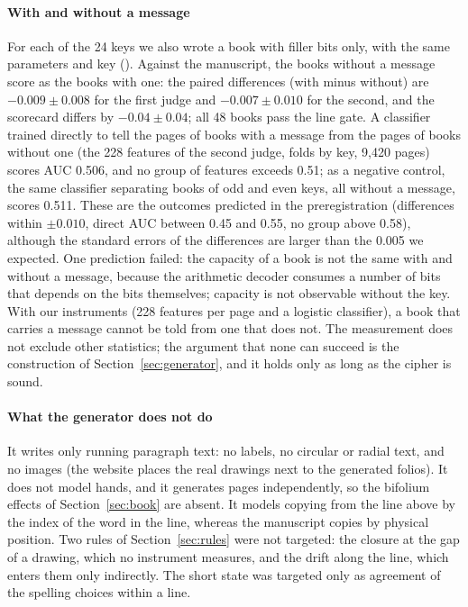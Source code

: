 \paragraph{With and without a message} For each of the 24 keys we also wrote a book with filler bits only, with the same
parameters and key (). Against the manuscript, the books without a message score as the books with one:
the paired differences (with minus without) are $-0.009 \pm 0.008$ for the first judge and $-0.007 \pm 0.010$ for the
second, and the scorecard differs by $-0.04 \pm 0.04$; all 48 books pass the line gate. A classifier trained directly to
tell the pages of books with a message from the pages of books without one (the 228 features of the second judge, folds by
key, 9{,}420 pages) scores AUC 0.506, and no group of features exceeds 0.51; as a negative control, the same classifier
separating books of odd and even keys, all without a message, scores 0.511. These are the outcomes predicted in the
preregistration (differences within $\pm 0.010$, direct AUC between 0.45 and 0.55, no group above 0.58), although the standard errors of the
differences are larger than the 0.005 we expected. One prediction failed: the capacity of a book is not the same with and without a message, because the arithmetic decoder consumes a
number of bits that depends on the bits themselves; capacity is not observable without the key. With our instruments (228 features
per page and a logistic classifier), a book that carries a message cannot be told from one that does not. The measurement
does not exclude other statistics; the argument that none can succeed is the construction of Section~\ref{sec:generator},
and it holds only as long as the cipher is sound.

\paragraph{What the generator does not do} It writes only running paragraph text: no labels, no circular or radial
text, and no images (the website places the real drawings next to the generated folios). It does not model hands, and
it generates pages independently, so the bifolium effects of Section~\ref{sec:book} are absent. It models copying from
the line above by the index of the word in the line, whereas the manuscript copies by physical position. Two rules of
Section~\ref{sec:rules} were not targeted: the closure at the gap of a drawing, which no instrument measures, and the
drift along the line, which enters them only indirectly. The short state was targeted only as agreement of the spelling
choices within a line.
